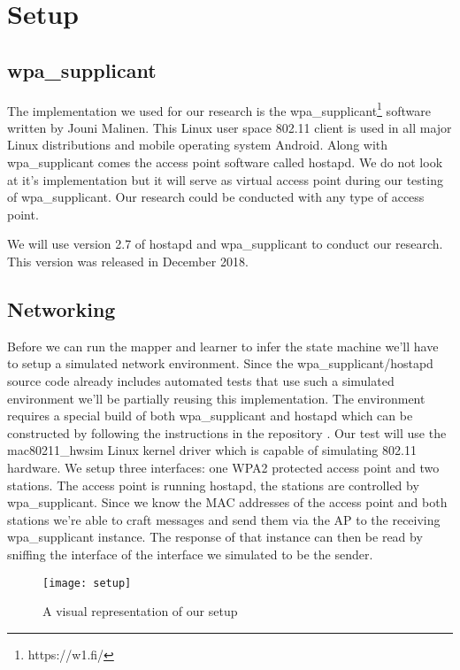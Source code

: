 \section{Setup}

\subsection{wpa\_supplicant}

The implementation we used for our research is the wpa\_supplicant\footnote{https://w1.fi/} software written by Jouni Malinen. This Linux user space 802.11 client is used in all major Linux distributions and mobile operating system Android.
Along with wpa\_supplicant comes the access point software called hostapd. We do not look at it's implementation but it will serve as virtual access point during our testing of wpa\_supplicant. Our research could be conducted with any type of access point.

We will use version 2.7 of hostapd and wpa\_supplicant to conduct our research. This version was released in December 2018.

\subsection{Networking}

Before we can run the mapper and learner to infer the state machine we'll have to setup a simulated network environment. Since the wpa\_supplicant/hostapd source code already includes automated tests that use such a simulated environment we'll be partially reusing this implementation.
The environment requires a special build of both wpa\_supplicant and hostapd which can be constructed by following the instructions in the repository \cite{Malinen:2013}.
Our test will use the mac80211\_hwsim Linux kernel driver which is capable of simulating 802.11 hardware. We setup three interfaces: one WPA2 protected access point and two stations. The access point is running hostapd, the stations are controlled by wpa\_supplicant. Since we know the MAC addresses of the access point and both stations we're able to craft messages and send them via the AP to the receiving wpa\_supplicant instance. The response of that instance can then be read by sniffing the interface of the interface we simulated to be the sender.

\begin{figure}[!h]
	\centering
	\texttt{[image: setup]}
	\caption{A visual representation of our setup}
	\label{fig:setup}
\end{figure}
